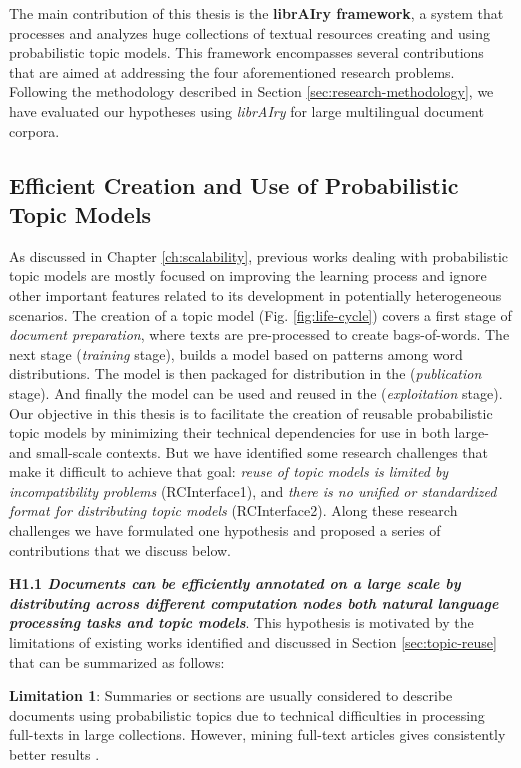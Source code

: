 The main contribution of this thesis is the \textbf{librAIry framework}, a system that processes and analyzes huge collections of textual resources creating and using probabilistic topic models. This framework encompasses several contributions that are aimed at addressing the four aforementioned research problems. Following the methodology described in Section \ref{sec:research-methodology}, we have evaluated our hypotheses using \textit{librAIry} for large multilingual document corpora. 

\subsection{Efficient Creation and Use of Probabilistic Topic Models}

As discussed in Chapter \ref{ch:scalability}, previous works dealing with probabilistic topic models are mostly focused on improving the learning process and ignore other important features related to its development in potentially heterogeneous scenarios. The creation of a topic model (Fig. \ref{fig:life-cycle}) covers a first stage of \textit{document preparation}, where texts are pre-processed to create bags-of-words. The next stage (\textit{training} stage),  builds a model based on patterns among word distributions. The model is then packaged for distribution in the (\textit{publication} stage). And finally the model can be used and reused in the (\textit{exploitation} stage). Our objective in this thesis is to facilitate the creation of reusable probabilistic topic models by minimizing their technical dependencies for use in both large- and small-scale contexts. But we have identified some research challenges that make it difficult to achieve that goal:  \textit{reuse of topic models is limited by incompatibility problems} (RCInterface1), and \textit{there is no unified or standardized format for distributing topic models} (RCInterface2). Along these research challenges we have formulated one hypothesis and proposed a series of contributions that we discuss below.

\textbf{H1.1 \textit{Documents can be efficiently annotated on a large scale by distributing across different computation nodes both natural language processing tasks and topic models}}. This hypothesis is motivated by the limitations of existing works identified and discussed in Section \ref{sec:topic-reuse} that can be summarized as follows:

\textbf{Limitation 1}: Summaries or sections are usually considered to describe documents using probabilistic topics due to technical difficulties in processing full-texts in large collections. However, mining full-text articles gives consistently better results \citep{Westergaard2017}.

